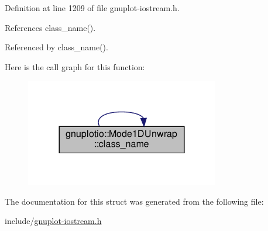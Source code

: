 Definition at line 1209 of file gnuplot-\/iostream.\+h.



References class\+\_\+name().



Referenced by class\+\_\+name().

Here is the call graph for this function\+:\nopagebreak
\begin{figure}[H]
\begin{center}
\leavevmode
\includegraphics[width=240pt]{structgnuplotio_1_1_mode1_d_unwrap_a2350096ad4d8b668f6df56c32cab69b6_cgraph}
\end{center}
\end{figure}


The documentation for this struct was generated from the following file\+:\begin{DoxyCompactItemize}
\item 
include/\hyperlink{gnuplot-iostream_8h}{gnuplot-\/iostream.\+h}\end{DoxyCompactItemize}
